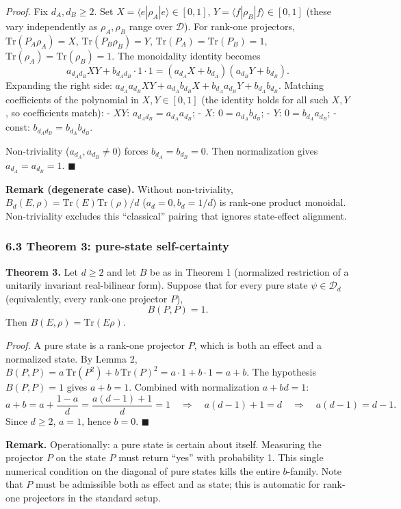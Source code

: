 \documentclass[
]{article}
\begin{document}
\emph{Proof.} Fix \(d_A,d_B\geq 2\). Set
\(X=\langle e|\rho_A|e\rangle\in[0,1]\),
\(Y=\langle f|\rho_B|f\rangle\in[0,1]\) (these vary independently as
\(\rho_A,\rho_B\) range over \(\mathcal D\)). For rank-one projectors,
\(\mathrm{Tr}(P_A\rho_A)=X\), \(\mathrm{Tr}(P_B\rho_B)=Y\),
\(\mathrm{Tr}(P_A)=\mathrm{Tr}(P_B)=1\),
\(\mathrm{Tr}(\rho_A)=\mathrm{Tr}(\rho_B)=1\). The monoidality identity
becomes
\[a_{d_Ad_B}XY + b_{d_Ad_B}\cdot 1\cdot 1 = (a_{d_A}X+b_{d_A})(a_{d_B}Y+b_{d_B}).\]
Expanding the right side:
\(a_{d_A}a_{d_B}XY+a_{d_A}b_{d_B}X+b_{d_A}a_{d_B}Y+b_{d_A}b_{d_B}\).
Matching coefficients of the polynomial in \(X,Y\in[0,1]\) (the identity
holds for all such \(X,Y\), so coefficients match): - \(XY\):
\(a_{d_Ad_B}=a_{d_A}a_{d_B}\); - \(X\): \(0=a_{d_A}b_{d_B}\); - \(Y\):
\(0=b_{d_A}a_{d_B}\); - const: \(b_{d_Ad_B}=b_{d_A}b_{d_B}\).

Non-triviality (\(a_{d_A},a_{d_B}\neq 0\)) forces \(b_{d_A}=b_{d_B}=0\).
Then normalization gives \(a_{d_A}=a_{d_B}=1\). \(\blacksquare\)

\textbf{Remark (degenerate case).} Without non-triviality,
\(B_d(E,\rho)=\mathrm{Tr}(E)\mathrm{Tr}(\rho)/d\) (\(a_d=0,b_d=1/d\)) is
rank-one product monoidal. Non-triviality excludes this ``classical''
pairing that ignores state-effect alignment.

\subsubsection{6.3 Theorem 3: pure-state
self-certainty}\label{theorem-3-pure-state-self-certainty}

\textbf{Theorem 3.} Let \(d\geq 2\) and let \(B\) be as in Theorem 1
(normalized restriction of a unitarily invariant real-bilinear form).
Suppose that for every pure state \(\psi\in\mathcal D_d\) (equivalently,
every rank-one projector \(P\)), \[B(P,P)=1.\] Then
\(B(E,\rho)=\mathrm{Tr}(E\rho)\).

\emph{Proof.} A pure state is a rank-one projector \(P\), which is both
an effect and a normalized state. By Lemma 2,
\(B(P,P)=a\,\mathrm{Tr}(P^2)+b\,\mathrm{Tr}(P)^2=a\cdot 1+b\cdot 1=a+b\).
The hypothesis \(B(P,P)=1\) gives \(a+b=1\). Combined with normalization
\(a+bd=1\):
\[a+b=a+\frac{1-a}{d}=\frac{a(d-1)+1}{d}=1\quad\Rightarrow\quad a(d-1)+1=d\quad\Rightarrow\quad a(d-1)=d-1.\]
Since \(d\geq 2\), \(a=1\), hence \(b=0\). \(\blacksquare\)

\textbf{Remark.} Operationally: a pure state is certain about itself.
Measuring the projector \(P\) on the state \(P\) must return ``yes''
with probability 1. This single numerical condition on the diagonal of
pure states kills the entire \(b\)-family. Note that \(P\) must be
admissible both as effect and as state; this is automatic for rank-one
projectors in the standard setup.
\end{document}
